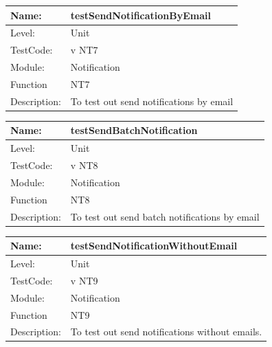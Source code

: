 \documentclass[12pt]{article}
\begin{document}
\begin{flushleft}
\begin{center}
\begin{tabular}{|l|p{12cm}|}
\end{tabular}
\end{center}

\begin{center}
\begin{tabular}{|l|p{12cm}|}
\hline

 Name: & testSendNotificationByEmail \\
\hline
Level: & Unit \\
\hline
TestCode: & v NT7 \\
\hline
Module:& Notification\\
\hline
Function & NT7 \\
\hline
Description: & To test out send notifications by email \\
\hline

\end{tabular}
\end{center}

\begin{center}
\begin{tabular}{|l|p{12cm}|}
\hline

 Name: & testSendBatchNotification \\
\hline
Level: & Unit \\
\hline
TestCode: & v NT8 \\
\hline
Module:& Notification\\
\hline
Function & NT8 \\
\hline
Description: & To test out send batch notifications by email \\
\hline

\end{tabular}
\end{center}

\begin{center}
\begin{tabular}{|l|p{12cm}|}
\hline

 Name: & testSendNotificationWithoutEmail \\
\hline
Level: & Unit \\
\hline
TestCode: & v NT9 \\
\hline
Module:& Notification\\
\hline
Function & NT9 \\
\hline
Description: & To test out send notifications without emails. \\
\hline


\end{tabular}
\end{center}
\end{flushleft}
\end{document}
